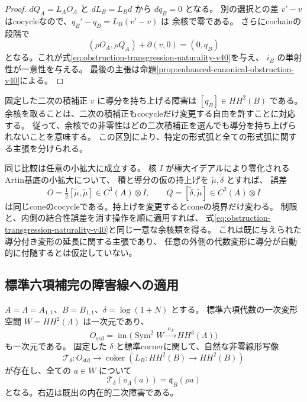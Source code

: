 \begin{proof}
$dQ_A=L_AO_A$ と $dL_B=L_Bd$ から $dq_B=0$ となる。
別の選択との差 $v'-v$ はcocycleなので、$q_B'-q_B=L_B(v'-v)$ は
余核で零である。
さらにcochainの段階で
\[
 (\rho O_A,\rho Q_A)+\partial(v,0)=(0,q_B)
\]
となる。これが式\eqref{eq:obstruction-transgression-naturality-v40}を与え、
$i_B$ の単射性が一意性を与える。
最後の主張は命題\ref{prop:enhanced-canonical-obstruction-v40}による。
\end{proof}

固定した二次の積補正 $v$ に導分を持ち上げる障害は $[q_B]\in HH^2(B)$ である。
余核を取ることは、二次の積補正もcocycleだけ変更する自由を許すことに対応する。
従って、余核での非零性はどの二次積補正を選んでも導分を持ち上げられないことを意味する。
この区別により、特定の形式弧と全ての形式弧に関する主張を分けられる。

同じ比較は任意の小拡大に成立する。
核 $I$ が極大イデアルにより零化されるArtin基底の小拡大について、
積と導分の仮の持上げを $\widetilde\mu,\widetilde\delta$ とすれば、
誤差
\[
 O=\tfrac12[\widetilde\mu,\widetilde\mu]\in C^3(A)\otimes I,
 \qquad Q=[\widetilde\delta,\widetilde\mu]\in C^2(A)\otimes I
\]
は同じconeのcocycleである。持上げを変更するとconeの境界だけ変わる。
制限と、内側の結合性誤差を消す操作を順に適用すれば、
式\eqref{eq:obstruction-transgression-naturality-v40}と同じ一意な余核類を得る。
これは既に与えられた導分付き変形の延長に関する主張であり、
任意の外側の代数変形に導分が自動的に付随するとは仮定していない。

\subsection{標準六項補完の障害線への適用}

\begin{corollary}[二つの非零障害を結ぶ標準的な写像]
\label{cor:vk-primary-obstruction-line-v40}
$A=\Lambda=A_{1,1}$、$B=B_{1,1}$、$\delta=\log(1+N)$ とする。
標準六項代数の一次変形空間 $W=HH^2(\Lambda)$ は一次元であり、
\[
 O_{\mathrm{std}}=
 \operatorname{im}\bigl(\operatorname{Sym}^2W
       \xrightarrow{\ o_\Lambda\ }HH^3(\Lambda)\bigr)
\]
も一次元である。
固定した $\delta$ と標準cornerに関して、自然な非零線形写像
\begin{equation}
 \mathcal T_\delta:O_{\mathrm{std}}\longrightarrow
 \operatorname{coker}(L_B:HH^2(B)\to HH^2(B))
 \label{eq:primary-obstruction-line-map-v40}
\end{equation}
が存在し、全ての $a\in W$ について
\[
 \mathcal T_\delta(o_\Lambda(a))=\mathfrak q_B(\rho a)
\]
となる。右辺は既出の内在的二次障害である。
\end{corollary}

